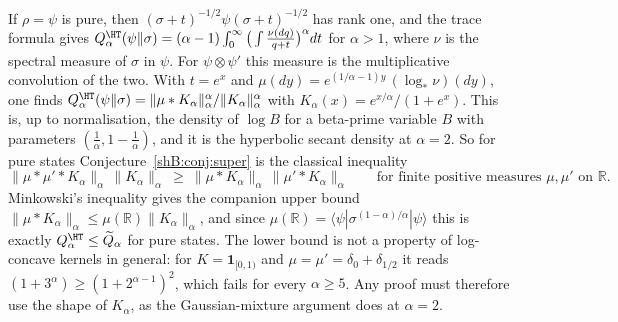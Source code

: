 \begin{remark}\label{shB:rem:superpure}
If $\rho=\psi$ is pure, then $(\sigma+t)^{-1/2}\psi(\sigma+t)^{-1/2}$ has rank one, and the trace formula gives $Q^\HT_\alpha(\psi\|\sigma)=(\alpha-1)\int_0^\infty\big(\int\frac{\nu(dq)}{q+t}\big)^\alpha dt$ for $\alpha>1$, where $\nu$ is the spectral measure of $\sigma$ in $\psi$. For $\psi\otimes\psi'$ this measure is the multiplicative convolution of the two. With $t=e^x$ and $\mu(dy)=e^{(1/\alpha-1)y}\,(\log_*\nu)(dy)$, one finds $Q^\HT_\alpha(\psi\|\sigma)=\|\mu*K_\alpha\|_\alpha^\alpha/\|K_\alpha\|_\alpha^\alpha$ with $K_\alpha(x)=e^{x/\alpha}/(1+e^x)$. This is, up to normalisation, the density of $\log B$ for a beta-prime variable $B$ with parameters $(\frac1\alpha,1-\frac1\alpha)$, and it is the hyperbolic secant density at $\alpha=2$. So for pure states Conjecture~\ref{shB:conj:super} is the classical inequality
\[
\|\mu*\mu'*K_\alpha\|_\alpha\,\|K_\alpha\|_\alpha\ \ge\ \|\mu*K_\alpha\|_\alpha\,\|\mu'*K_\alpha\|_\alpha\qquad\text{for finite positive measures }\mu,\mu'\text{ on }\mathbb R .
\]
Minkowski's inequality gives the companion upper bound $\|\mu*K_\alpha\|_\alpha\le\mu(\mathbb R)\|K_\alpha\|_\alpha$, and since $\mu(\mathbb R)=\langle\psi|\sigma^{(1-\alpha)/\alpha}|\psi\rangle$ this is exactly $Q^\HT_\alpha\le\widetilde Q_\alpha$ for pure states. The lower bound is not a property of log-concave kernels in general: for $K=\mathbf 1_{[0,1)}$ and $\mu=\mu'=\delta_0+\delta_{1/2}$ it reads $(1+3^\alpha)\ge(1+2^{\alpha-1})^2$, which fails for every $\alpha\ge5$. Any proof must therefore use the shape of $K_\alpha$, as the Gaussian-mixture argument does at $\alpha=2$.


\end{remark}
